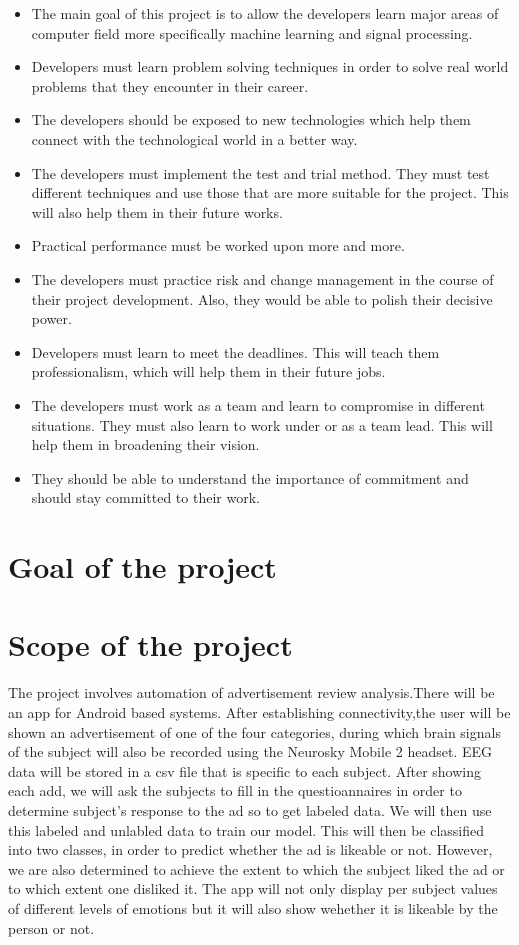 \documentclass[a4paper, 12pt, oneside]{uet_thesis}
\begin{document}
\begin{itemize}
\item The main goal of this project is to allow the developers learn major areas of computer field more specifically machine learning and signal processing.
\item Developers must learn problem solving techniques in order to solve real world problems that they encounter in their career.
\item The developers should be exposed to new technologies which help them connect with the technological world in a better way.
\item The developers must implement the test and trial method. They must test different techniques and use those that are more suitable for the project. This will also help them in their future works.
\item Practical performance must be worked upon more and more.
\item The developers must practice risk and change management in the course of their project development. Also, they would be able to polish their decisive power.
\item Developers must learn to meet the deadlines. This will teach them professionalism, which will help them in their future jobs.
\item The developers must work as a team and learn to compromise in different situations. They must also learn to work under or as a team lead. This will help them in broadening their vision.
\item They should be able to understand the importance of commitment and should stay committed to their work.
\end{itemize}
\newpage
\chapter{Goal of the project}
\newpage
\chapter{Scope of the project}
The project involves automation of advertisement review analysis.There will be an app for Android based systems. After establishing connectivity,the user will be shown an advertisement of one of the four categories, during which  brain signals of the subject will also be recorded using the Neurosky Mobile 2 headset. EEG data will be stored in a csv file that is specific to each subject. After showing each add, we will ask the subjects to fill in the questioannaires in order to determine subject's response to the ad so to get labeled data. We will then use this labeled and unlabled data to train our model. This will then be classified into two classes, in order to predict whether the ad is likeable or  not. However, we are also determined to achieve the extent to which the subject liked the ad or to which extent one disliked it. The app will not only display per subject values of different levels of emotions but it will also show wehether it is likeable by the person or not.
\newpage
\end{document}
